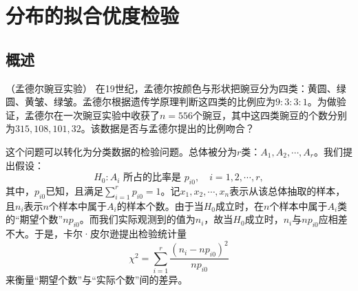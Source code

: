 \section{分布的拟合优度检验}
\subsection{概述}
\begin{example}{（孟德尔豌豆实验）}\label{ex:chap23_pea_experiment}
    在19世纪，孟德尔按颜色与形状把豌豆分为四类：黄圆、绿圆、黄皱、绿皱。孟德尔根据遗传学原理判断这四类的比例应为$9:3:3:1$。为做验证，孟德尔在一次豌豆实验中收获了$n=556$个豌豆，其中这四类豌豆的个数分别为$315,108,101,32$。该数据是否与孟德尔提出的比例吻合？

    这个问题可以转化为分类数据的检验问题。总体被分为$r$类：$A_1,A_2,\cdots,A_r$。我们提出假设：
    $$
    H_0: A_i\text{ 所占的比率是 }p_{i0},\quad i=1,2,\cdots,r,    $$
    其中，$p_{i0}$已知，且满足$\sum_{i=1}^r p_{i0}=1$。记$x_1,x_2,\cdots,x_n$表示从该总体抽取的样本，且$n_i$表示$n$个样本中属于$A_i$的样本个数。由于当$H_0$成立时，在$n$个样本中属于$A_i$类的“期望个数”$np_{i0}$。而我们实际观测到的值为$n_i$，故当$H_0$成立时，$n_i$与$np_{i0}$应相差不大。于是，卡尔·皮尔逊提出检验统计量
    $$
    \chi^2 = \sum_{i=1}^r \frac{(n_i - np_{i0})^2}{np_{i0}}
    $$
    来衡量“期望个数”与“实际个数”间的差异。
    \end{example}
    
